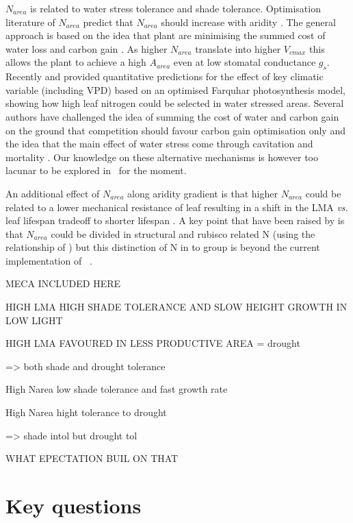 \documentclass[a4paper,11pt]{article}
\begin{document}
$N_{area}$ is related to water stress tolerance and shade tolerance. Optimisation literature of $N_{area}$ predict that $N_{area}$ should
increase with aridity \citep{Wright-2003}. The general approach is
based on the idea that plant are minimising the summed cost of water
loss and carbon gain
\citep{Medlyn-2002,Wright-2003,Prentice-2014,Lu-2016,Wang-2017,Dong-2017}. As
higher $N_{area}$ translate into higher $V_{cmax}$ this allows the
plant to achieve a high $A_{area}$ even at low stomatal conductance
$g_s$. Recently \citet{Prentice-2014} and \citet{Dong-2017} provided
quantitative predictions for the effect of key climatic variable
(including VPD) based on an optimised Farquhar photosynthesis
model, showing how high leaf nitrogen could be selected in water stressed areas. Several authors have challenged the idea of summing the cost of
water and carbon gain on the ground that competition should favour
carbon gain optimisation only \citep{Wolf-2016} and the idea that the
main effect of water stress come through cavitation and mortality \citep{Sperry-2016,Sperry-2017}. Our knowledge on these alternative mechanisms is however too lacunar to be explored in \plant\ for the moment.

An additional effect of $N_{area}$ along aridity gradient is that higher $N_{area}$ could be related to a lower mechanical resistance of leaf resulting in a shift in the LMA \textit{vs.} leaf lifespan tradeoff to shorter lifespan \citep{Wright-2002a}. A key point that have been raised by \citet{Dong-2017} is that
$N_{area}$ could be divided in structural and rubisco related N (using
the relationship of \citet{Onoda-2004}) but this distinction of N in to group is beyond the current implementation of \plant\ .


MECA INCLUDED HERE

HIGH LMA HIGH SHADE TOLERANCE AND SLOW HEIGHT GROWTH IN LOW LIGHT

HIGH LMA FAVOURED IN LESS PRODUCTIVE AREA = drought

=> both shade and drought tolerance

High Narea low shade tolerance and fast growth rate

High Narea hight tolerance to drought

=> shade intol but drought tol

WHAT EPECTATION BUIL ON THAT


\section{Key questions}
\end{document}
